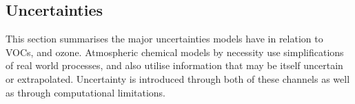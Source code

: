     
    
    
    
    
    
  \subsection{Uncertainties}
  \label{LR:Models:Uncert}
    
    This section summarises the major uncertainties models have in relation to  VOCs, and ozone.
    Atmospheric chemical models by necessity use simplifications of real world processes, and also utilise information that may be itself uncertain or extrapolated.
    Uncertainty is introduced through both of these channels as well as through computational limitations.
    
    
    
